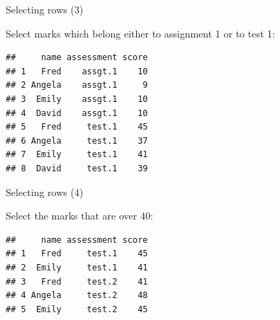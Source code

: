 \begin{frame}[fragile]{Selecting rows (3)}
  
Select marks which belong either to assignment 1 or to test 1:

\begin{knitrout}
\color{fgcolor}\begin{kframe}
\begin{alltt}
    \hlopt{==} \hlopt{|} \hlopt{==}\hlstd{)}
\end{alltt}
\begin{verbatim}
##     name assessment score
## 1   Fred    assgt.1    10
## 2 Angela    assgt.1     9
## 3  Emily    assgt.1    10
## 4  David    assgt.1    10
## 5   Fred     test.1    45
## 6 Angela     test.1    37
## 7  Emily     test.1    41
## 8  David     test.1    39
\end{verbatim}
\end{kframe}
\end{knitrout}
  
\end{frame}

\begin{frame}[fragile]{Selecting rows (4)}
  
Select the marks that are over 40:

\begin{knitrout}
\color{fgcolor}\begin{kframe}
\begin{alltt}
\hlopt{>}\hlstd{)}
\end{alltt}
\begin{verbatim}
##     name assessment score
## 1   Fred     test.1    45
## 2  Emily     test.1    41
## 3   Fred     test.2    41
## 4 Angela     test.2    48
## 5  Emily     test.2    45
\end{verbatim}
\end{kframe}
\end{knitrout}
  
\end{frame}

